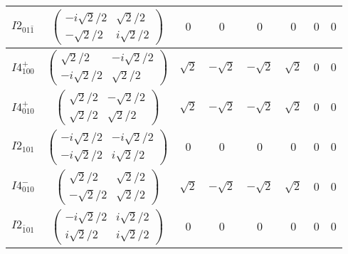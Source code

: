 \documentclass[3p,preprint]{elsarticle}
\begin{document}
\begin{table}[H]
\begin{tabular}{|c|c||c|c|c|c|c|c|}
			$I2_{01\bar{1}}$ &		$\left(\begin{array}{cc} -i\sqrt{2}/2&\sqrt{2}/2 \\ -\sqrt{2}/2&i\sqrt{2}/2 \end{array}\right)$	&$0$ & $0$ & $0$ & $0$ & $0$ & $0$ \\ \hline
			$I4^{+}_{100}$ &		$\left(\begin{array}{cc} \sqrt{2}/2&-i\sqrt{2}/2 \\ -i\sqrt{2}/2&\sqrt{2}/2 \end{array}\right)$	&$\sqrt{2}$ & $-\sqrt{2}$ & $-\sqrt{2}$ & $\sqrt{2}$ & $0$ & $0$ \\ \hline
			$I4^{+}_{010}$ &		$\left(\begin{array}{cc} \sqrt{2}/2&-\sqrt{2}/2 \\ \sqrt{2}/2&\sqrt{2}/2 \end{array}\right)$	&$\sqrt{2}$ & $-\sqrt{2}$ & $-\sqrt{2}$ & $\sqrt{2}$ & $0$ & $0$ \\ \hline
			$I2_{101}$ &		$\left(\begin{array}{cc} -i\sqrt{2}/2&-i\sqrt{2}/2 \\ -i\sqrt{2}/2&i\sqrt{2}/2 \end{array}\right)$	&$0$ & $0$ & $0$ & $0$ & $0$ & $0$ \\ \hline
			$I4^{-}_{010}$ &		$\left(\begin{array}{cc} \sqrt{2}/2&\sqrt{2}/2 \\ -\sqrt{2}/2&\sqrt{2}/2 \end{array}\right)$	&$\sqrt{2}$ & $-\sqrt{2}$ & $-\sqrt{2}$ & $\sqrt{2}$ & $0$ & $0$ \\ \hline			
			$I2_{\bar{1}01}$ &		$\left(\begin{array}{cc} -i\sqrt{2}/2&i\sqrt{2}/2 \\ i\sqrt{2}/2&i\sqrt{2}/2 \end{array}\right)$	&$0$ & $0$ & $0$ & $0$ & $0$ & $0$ \\ \hline
	\end{tabular}
\end{table}
\end{document}
